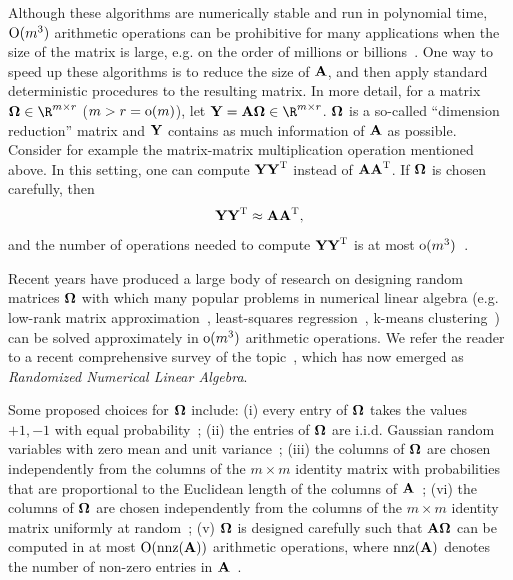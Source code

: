 Although these algorithms are numerically stable and run in polynomial time,
$\mathrm{O}(m^3)$  arithmetic operations can be prohibitive for many applications when the size of the matrix is large, e.g. on the order of millions or billions~\cite{MMDS08,Mah10}.
One way to speed up these algorithms is to reduce the size of ${\bm{\mathrm{A}}}$, and then apply standard deterministic procedures to the
resulting matrix.  In more detail, for a matrix $\matOmega \in \R^{m \times r}$ ($ m > r = \mathrm{o}(m) $), let $\matY = \matA \matOmega \in \R^{m \times r}$.
${\bm{\mathrm{\Omega}}}$ is a so-called ``dimension reduction'' matrix and ${\bm{\mathrm{Y}}}$ contains as much information of ${\bm{\mathrm{A}}}$ as possible.
Consider for example the matrix-matrix multiplication operation mentioned above. In this setting, one can compute
${\bm{\mathrm{Y}}} {\bm{\mathrm{Y}}}^{\textsc{T}}$ instead of ${\bm{\mathrm{A}}} {\bm{\mathrm{A}}}^{\textsc{T}}$. If ${\bm{\mathrm{\Omega}}}$ is chosen carefully, then
$${\bm{\mathrm{Y}}} {\bm{\mathrm{Y}}}^{\textsc{T}} \approx {\ensuremath{\bm{\mathrm{A}}}} {\ensuremath{\bm{\mathrm{A}}}}^{\textsc{T}},$$
and the number of operations needed to compute ${\bm{\mathrm{Y}}} {\bm{\mathrm{Y}}}^{\textsc{T}}$ is at most $\mathrm{o}(m^3)$~\cite{DK01,DKM06a}.

Recent years have produced a large body of research on designing random matrices ${\bm{\mathrm{\Omega}}}$ with which many popular problems
in numerical linear algebra (e.g. low-rank matrix approximation~\cite{DKM06b,DKM06c}, least-squares regression~\cite{Sar06,BD09,Cla13}, k-means clustering~\cite{BZD10})
can be solved approximately
in $\mathrm{o}(m^3)$ arithmetic operations. We refer the reader to a recent comprehensive
survey of the topic~\cite{HMT}, which has now emerged as \emph{Randomized Numerical Linear Algebra}.

Some proposed choices for ${\bm{\mathrm{\Omega}}}$ include: (i) every entry of ${\bm{\mathrm{\Omega}}}$ takes the values $+1,-1$ with equal probability~\cite{CW09,Zou10}; (ii) the entries of ${\bm{\mathrm{\Omega}}}$ are
i.i.d. Gaussian random variables with zero mean and unit variance~\cite{HMT};
(iii) the columns of ${\bm{\mathrm{\Omega}}}$ are chosen independently from the columns of the $m \times m$ identity matrix
with probabilities that are proportional to the Euclidean length of the columns of ${\bm{\mathrm{A}}}$~\cite{FKV98,DKM06b};
(vi) the columns of ${\bm{\mathrm{\Omega}}}$ are chosen independently from the columns of the $m \times m$ identity matrix uniformly at random~\cite{Git12};
(v) ${\bm{\mathrm{\Omega}}}$ is designed carefully such that ${\bm{\mathrm{A}}} {\bm{\mathrm{\Omega}}}$ can be computed in at most $\mathrm{O}({ \rm nnz }({\bm{\mathrm{A}}})) $ arithmetic operations,
where ${ \rm nnz }({\bm{\mathrm{A}}})$ denotes the number of non-zero entries in ${\bm{\mathrm{A}}}$~\cite{CW12}.


